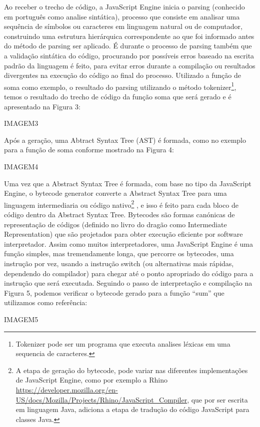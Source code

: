 \documentclass{article}
\begin{document}
Ao receber o trecho de código, a JavaScript Engine inicia o parsing (conhecido em
português como analise sintática), processo que consiste em analisar uma sequência de
símbolos ou caracteres em linguagem natural ou de computador, construindo uma estrutura
hierárquica correspondente ao que foi informado antes do método de parsing ser aplicado.
É durante o processo de parsing também que a validação sintática do código, procurando
por possíveis erros baseado na escrita padrão da linguagem é feito, para evitar erros
durante a compilação ou resultados divergentes na execução do código ao final do
processo.
Utilizado a função de soma como exemplo, o resultado do parsing utilizando o método
tokenizer\footnote{Tokenizer pode ser um programa que executa analises léxicas em uma sequencia de caracteres.}, temos o resultado do trecho de código da função soma que será gerado e é
apresentado na Figura 3:

IMAGEM3

Após a geração, uma Abtract Syntax Tree (AST) é formada, como no exemplo para a função
de soma conforme mostrado na Figura 4:

IMAGEM4

Uma vez que a Abstract Syntax Tree é formada, com base no tipo da JavaScript Engine, o
bytecode generator converte a Abstract Syntax Tree para uma linguagem intermediaria ou
código nativo\footnote{A etapa de geração do bytecode, pode variar nas diferentes implementações de JavaScript Engine, como
por exemplo a Rhino \url{https://developer.mozilla.org/en-US/docs/Mozilla/Projects/Rhino/JavaScript_Compiler},
que por ser escrita em linguagem Java, adiciona a etapa de tradução do código JavaScript para classes
Java.}
, e isso é feito para cada bloco de código dentro da Abstract Syntax Tree.
Bytecodes são formas canónicas de representação de códigos (definido no livro do dragão
como Intermediate Representation) que são projetados para obter execução eficiente por
software interpretador. Assim como muitos interpretadores, uma JavaScript Engine é uma
função simples, mas tremendamente longa, que percorre os bytecodes, uma instrução por
vez, usando a instrução switch (ou alternativas mais rápidas, dependendo do compilador)
para chegar até o ponto apropriado do código para a instrução que será executada.
Seguindo o passo de interpretação e compilação na Figura 5, podemos verificar o bytecode
gerado para a função “sum” que utilizamos como referência:

IMAGEM5
\end{document}
